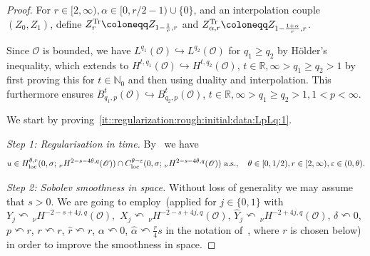 \documentclass[reqno]{amsart}
\newcommand{\N}{\mathbb{N}}
\newcommand{\R}{\mathbb{R}}
\newcommand{\sO}{\mathscr{O}}
\newcommand{\ce}{\coloneqq}
\newcommand{\1}{\mathbf{1}}
\newcommand{\loc}{\textup{loc}}
\newcommand{\nH}{\ensuremath{\,_\nu H}}
\newcommand{\bpsn}[1]{\ensuremath{\nH^{#1}(\sO)}}
\begin{document}
	\begin{proof}
				For $r\in [2,\infty), \alpha\in [0,r/2-1)\cup \{0\}$, and an interpolation couple $(Z_0,Z_1)$, define $Z_r^\textup{Tr}\ce Z_{1-\frac{1}{r},r}$ and  $Z_{\alpha,r}^\textup{Tr}\ce Z_{1-\frac{1+\alpha}{r},r}$. 
				
				Since $\sO$ is bounded, we have $L^{q_1}(\sO)\hookrightarrow L^{q_2}(\sO)$ for $q_1\ge  q_2$ by Hölder's inequality, which extends to $H^{t,q_1}(\sO)\hookrightarrow H^{t,q_2}(\sO)$, $t\in\R, \infty >q_1\ge q_2>1$ by first proving this for $t\in \N_0$ and then using duality and interpolation.
                This furthermore ensures $B^t_{q_1,p}(\sO)\hookrightarrow B^t_{q_2,p}(\sO)$, $t\in\R, \infty> q_1\ge q_2>1, 1<p<\infty$.
				
				We start by proving~\ref{it::regularization:rough:initial:data:LpLq:1}.
				
				\emph{Step 1: Regularisation in time.} By~\cite[Theorems 5.6 and 5.7]{agrestiNonlinearSPDEsMaximal2025} we have
				\[u\in H_{\loc}^{\theta,r}(0,\sigma; \nH^{2-s-4\theta,q}(\sO))\cap C_{\loc}^{\theta-\varepsilon}(0,\sigma; \nH^{2-s-4\theta,q}(\sO)) \text{ a.s.}, \quad \theta\in [0,1/2), r\in[2,\infty), \varepsilon\in (0,\theta).\]
				
				\emph{Step 2: Sobolev smoothness in space.} Without loss of generality we may assume that $s>0$. 
				We are going to employ~\cite[Theorem 6.3]{agrestiNonlinearParabolicStochastic2022a}(applied for $j\in \{0,1\}$ with $Y_j\curvearrowleft\bpsn{-2-s+4j,q}, $ $ X_j \curvearrowleft \bpsn{-2-s+4j,q}$, $ \widehat{Y}_j\curvearrowleft \bpsn{-2+4j,q}$, $\delta\curvearrowleft0$, $p\curvearrowleft r$,  $r\curvearrowleft r$, $ \widehat{r}\curvearrowleft r $, $\alpha\curvearrowleft 0$, $\widehat{\alpha}\curvearrowleft \frac{r}{4}s$ in the notation of~\cite[Theorem 6.3]{agrestiNonlinearParabolicStochastic2022a}, where $r$ is chosen below) in order to improve the smoothness in space. 
                

\end{proof}
\end{document}
